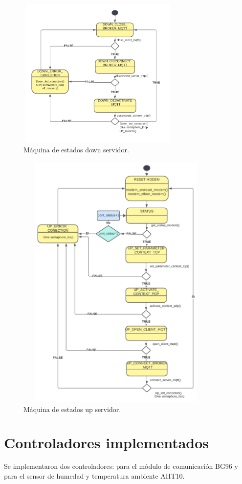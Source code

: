 \begin{figure}[h]
  \centering
  \includegraphics[width=8cm, height=7.5cm]{./Figures/SM down server.png}
  \caption{Máquina de estados down servidor.}
  \label{fig:Maquina de estados dowm servidor}
\end{figure}
\clearpage

\begin{figure}[t!]
  \centering
	\includegraphics[width=10cm, height=13cm]{./Figures/SM up server.png}
	\caption{Máquina de estados up servidor.}
	\label{fig:Maquina de estados up servidor}
\end{figure}

\section{Controladores implementados}
Se implementaron dos controladores: para el módulo de comunicación BG96 y para el sensor de humedad y temperatura ambiente AHT10.

